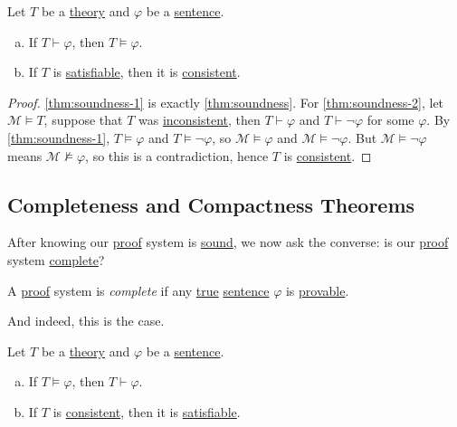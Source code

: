 \begin{theorem}[Soundness]\label{thm:soundness}
	Let \(T\) be a \hyperref[def:theory]{theory} and \(\varphi \) be a \hyperref[def:sentence]{sentence}.
	\begin{enumerate}[(a)]
		\item\label{thm:soundness-1} If \(T \vdash \varphi \), then \(T \models \varphi \).
		\item\label{thm:soundness-2} If \(T\) is \hyperref[def:satisfiable]{satisfiable}, then it is \hyperref[def:consistent]{consistent}.
	\end{enumerate}
\end{theorem}
\begin{proof}
	\autoref{thm:soundness-1} is exactly \autoref{thm:soundness}. For \autoref{thm:soundness-2}, let \(\mathcal{M} \models T\), suppose that \(T\) was \hyperref[def:inconsistent]{inconsistent}, then \(T\vdash \varphi \) and \(T\vdash \lnot \varphi \) for some \(\varphi \). By \autoref{thm:soundness-1}, \(T \models \varphi \) and \(T \models \lnot \varphi \), so \(\mathcal{M} \models \varphi \) and \(\mathcal{M} \models \lnot \varphi \). But \(\mathcal{M} \models \lnot \varphi \) means \(\mathcal{M} \not \models \varphi \), so this is a contradiction, hence \(T\) is \hyperref[def:consistent]{consistent}.
\end{proof}

\subsection{Completeness and Compactness Theorems}
After knowing our \hyperref[def:proof]{proof} system is \hyperref[def:sound]{sound}, we now ask the converse: is our \hyperref[def:proof]{proof} system \hyperref[def:complete]{complete}?

\begin{definition}[Complete]\label{def:complete}
	A \hyperref[def:proof]{proof} system is \emph{complete} if any \hyperref[def:truth]{true} \hyperref[def:sentence]{sentence} \(\varphi \) is \hyperref[def:proof]{provable}.
\end{definition}

And indeed, this is the case.

\begin{theorem}[Completeness]\label{thm:completeness}
	Let \(T\) be a \hyperref[def:theory]{theory} and \(\varphi \) be a \hyperref[def:sentence]{sentence}.
	\begin{enumerate}[(a)]
		\item\label{thm:completeness-1} If \(T \models \varphi \), then \(T \vdash \varphi \).
		\item\label{thm:completeness-2} If \(T\) is \hyperref[def:consistent]{consistent}, then it is \hyperref[def:satisfiable]{satisfiable}.
	\end{enumerate}
\end{theorem}

